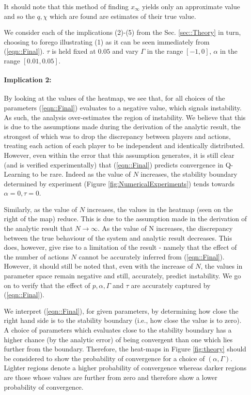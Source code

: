\documentclass[sigconf,anonymous]{aamas}
\newcommand{\xfixed}{x_\infty}
\begin{document}
It should note that this method of finding $\xfixed$ yields only an approximate value and so the $q, \chi$ which are found are estimates of their true value. 

We consider each of the implications (2)-(5) from the Sec. \ref{sec::Theory}
in turn, choosing to forego illustrating (1) as it can be seen immediately
from (\ref{eqn::Final}). $\tau$ is held fixed
at $0.05$ and vary $\Gamma$ in
the range $[-1, 0]$, $\alpha$ in the range $[0.01, 0.05]$.

\paragraph{Implication 2:} By looking at the values of the heatmap, we see that, for all choices
of the parameters
(\ref{eqn::Final}) evaluates to a negative value, which signals
instability. As such, the analysis over-estimates the region of
instability. We believe that this is due to the
assumptions made during the derivation of the analytic result, the
strongest of which was to drop the discrepancy between players and
actions, treating each action of each player to be independent and
identically distributed. However, even within the error that this
assumption generates, it is still clear (and is verified
experimentally) that (\ref{eqn::Final}) predicts convergence in Q-Learning to be rare. Indeed as the
value of $N$ increases, the stability boundary determined by
experiment (Figure \ref{fig:NumericalExperiments}) tends towards
$\alpha = 0, \tau = 0$.

Similarly, as the value of $N$ increases, the values in the heatmap
(seen on the right of the map) reduce. This is due to the assumption
made in the derivation of the analytic result that $N \rightarrow
\infty$. As the value of N increases, the discrepancy between the true
behaviour of the system and analytic result decreases. This does,
however, give rise to a limitation of the result - namely that the
effect of the number of actions $N$ cannot be accurately inferred from
 (\ref{eqn::Final}). However, it should still be noted that, even
with the increase of $N$, the values in parameter space remain negative
and still, accurately, predict instability. We go on to verify that
the effect of $p, \alpha, \Gamma$ and $\tau$ are accurately captured
by (\ref{eqn::Final}).

We interpret (\ref{eqn::Final}), for given parameters, by determining
how close the right hand side is to the stability boundary (i.e., how
close the value is to zero). A choice of parameters which evaluates
close to the stability boundary has a higher chance (by the analytic
error) of being convergent than one which lies further from the
boundary. Therefore, the heat-maps in Figure \ref{fig:theory} should
be considered to show the probability of convergence for a choice of
$(\alpha, \Gamma)$. Lighter regions denote a higher probability of
convergence whereas darker regions are those whose values are further
from zero and therefore show a lower probability of convergence.
\end{document}
